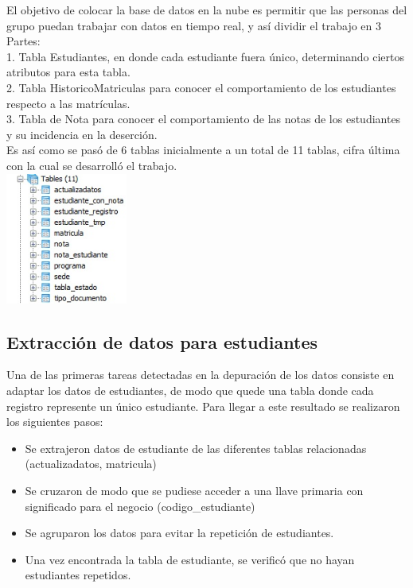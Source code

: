\documentclass[fleqn,10pt]{SelfArx} %
\begin{document}
El objetivo de colocar la base de datos en la nube es permitir que las personas del grupo puedan trabajar con datos en tiempo real, y así dividir el trabajo en 3 Partes:\\
1.	Tabla Estudiantes, en donde cada estudiante fuera único, determinando ciertos atributos para esta tabla.\\
2.	Tabla  HistoricoMatriculas para conocer el comportamiento de los estudiantes respecto a las matrículas.\\
3.	Tabla de Nota para conocer el comportamiento de las notas de los estudiantes y su incidencia en la deserción.\\ 

Es así como se pasó de 6 tablas inicialmente a un total de 11 tablas, cifra última con la cual se desarrolló el trabajo.\\

\includegraphics[width=4cm]{img/tablas11.jpg}\\ 

\subsection{Extracción de datos para estudiantes}

Una de las primeras tareas detectadas en la depuración de los datos consiste en adaptar los datos de estudiantes, de modo que quede una tabla donde cada registro represente un único estudiante. Para llegar a este resultado se realizaron los siguientes pasos:\\

\begin{itemize}
	\item Se extrajeron datos de estudiante de las diferentes tablas relacionadas (actualizadatos, matricula)
	\item Se cruzaron de modo que se pudiese acceder a una llave primaria con significado para el negocio (codigo\_estudiante)
	\item Se agruparon los datos para evitar la repetición de estudiantes.
	\item Una vez encontrada la tabla de estudiante, se verificó que no hayan estudiantes repetidos.
\end{itemize}
\end{document}
